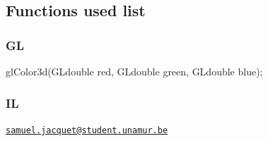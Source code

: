 \documentclass[12pt]{article}
\begin{document}
\subsection{Functions used list}
\subsubsection{GL}
\begin{tabbing}
glColor3d(GLdouble red, GLdouble green, GLdouble blue);
\end{tabbing}

\subsubsection{IL}
\begin{tabbing}

\end{tabbing}
\newpage

%

\newpage
\href{mailto:samuel.jacquet@student.unamur.be}{\nolinkurl{samuel.jacquet@student.unamur.be} }
\end{document}
